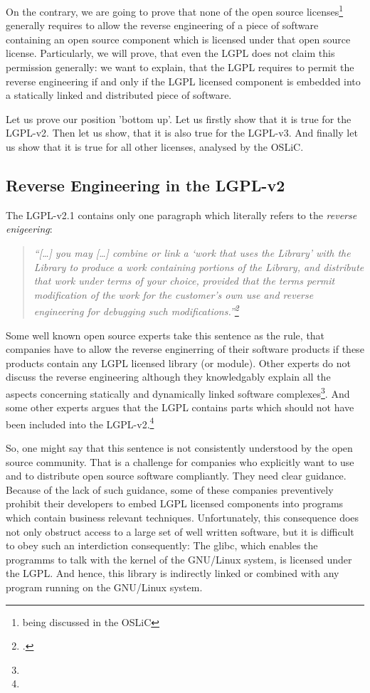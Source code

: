 On the contrary, we are going to prove that none of the open source
licenses\footnote{being discussed in the OSLiC} generally requires to allow the
reverse engineering of a piece of software containing an open source component
which is licensed under that open source license. Particularly, we will prove,
that even the LGPL does not claim this permission generally: we want to
explain, that the LGPL requires to permit the reverse engineering if and only if
the LGPL licensed component is embedded into a statically linked and distributed
piece of software.

Let us prove our position 'bottom up'. Let us firstly show that it is true for
the LGPL-v2. Then let us show, that it is also true for the LGPL-v3. And finally
let us show that it is true for all other licenses, analysed by the OSLiC.

\subsection{Reverse Engineering in the LGPL-v2}
The LGPL-v2.1 contains only one paragraph which literally refers to the
\emph{reverse enigeering}:

\begin{quote}\noindent\emph{\enquote{[\ldots] you may [\ldots] combine or link a
\enquote{work that uses the Library} with the Library to produce a work
containing portions of the Library, and distribute that work under terms of your
choice, provided that the terms permit modification of the work for the
customer's own use and \emph{reverse engineering} for debugging such
modifications.}\footcite[cf.][\nopage wp]{Lgpl21OsiLicense1999a}}
\end{quote}

Some well known open source experts take this sentence as the rule, that
companies have to allow the reverse enginerring of their software products if
these products contain any LGPL licensed library (or module). Other experts do
not discuss the reverse engineering although they knowledgably explain all the
aspects concerning statically and dynamically linked software
complexes\footnote{}. And some other experts argues that the LGPL contains parts
which should not have been included into the LGPL-v2.\footnote{}

So, one might say that this sentence is not consistently understood by the open
source community. That is a challenge for companies who explicitly want to use
and to distribute open source software compliantly. They need clear guidance.
Because of the lack of such guidance, some of these companies preventively
prohibit their developers to embed LGPL licensed components into programs which
contain business relevant techniques. Unfortunately, this consequence does not
only obstruct access to a large set of well written software, but it is
difficult to obey such an interdiction consequently: The glibc, which enables
the programms to talk with the kernel of the GNU/Linux system, is licensed under
the LGPL. And hence, this library is indirectly linked or combined with any
program running on the GNU/Linux system.

